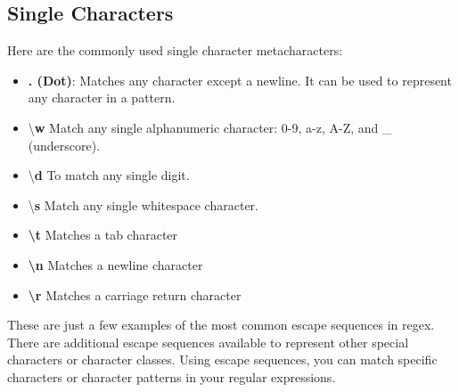 \documentclass{report}
\begin{document}
    \subsection{Single Characters}
    \bigbreak \noindent 
    Here are the commonly used single character metacharacters:
    \begin{itemize}
        \item \textbf{. (Dot)}: Matches any character except a newline. It can be used to represent any character in a pattern.
        \item \textbackslash{\textbf{w}} Match any single alphanumeric character: 0-9, a-z, A-Z, and \_ (underscore).
        \item \textbackslash{\textbf{d}} To match any single digit.
        \item \textbackslash{\textbf{s}} Match any single whitespace character.
    \end{itemize}
    \bigbreak \noindent 
    \bigbreak \noindent 
    \begin{itemize}
        \item \textbf{\textbackslash t} Matches a tab character
        \item \textbf{\textbackslash n} Matches a newline character
        \item \textbf{\textbackslash r} Matches a carriage return character
    \end{itemize}
    \bigbreak \noindent 
    These are just a few examples of the most common escape sequences in regex. There are additional escape sequences available to represent other special characters or character classes. Using escape sequences, you can match specific characters or character patterns in your regular expressions.

    \pagebreak \bigbreak \noindent
\end{document}
